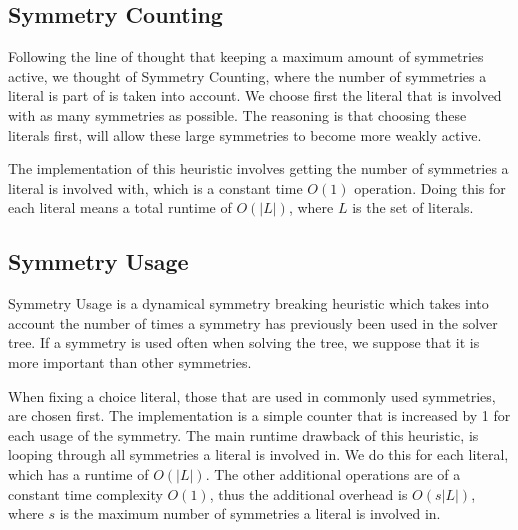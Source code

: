 \subsection{Symmetry Counting}
	Following the line of thought that keeping a maximum amount of symmetries active,
	we thought of Symmetry Counting, where the number of symmetries a literal is part of is taken into account.
	We choose first the literal that is involved with as many symmetries as possible.
	The reasoning is that choosing these literals first, will allow these large symmetries to become more weakly active.

	The implementation of this heuristic involves getting the number of symmetries a literal is involved with,
	which is a constant time $O(1)$ operation.
	Doing this for each literal means a total runtime of $O(|L|)$, where $L$ is the set of literals.


\subsection{Symmetry Usage}
	Symmetry Usage is a dynamical symmetry breaking heuristic
	which takes into account the number of times a symmetry has previously been used in the solver tree.
	If a symmetry is used often when solving the tree, we suppose that it is more important than other symmetries.

	When fixing a choice literal, those that are used in commonly used symmetries, are chosen first.
	The implementation is a simple counter that is increased by 1 for each usage of the symmetry.
	The main runtime drawback of this heuristic, is looping through all symmetries a literal is involved in.
	We do this for each literal, which has a runtime of $O(|L|)$.
	The other additional operations are of a constant time complexity $O(1)$, thus the additional overhead is $O(s|L|)$,
	where $s$ is the maximum number of symmetries a literal is involved in.

